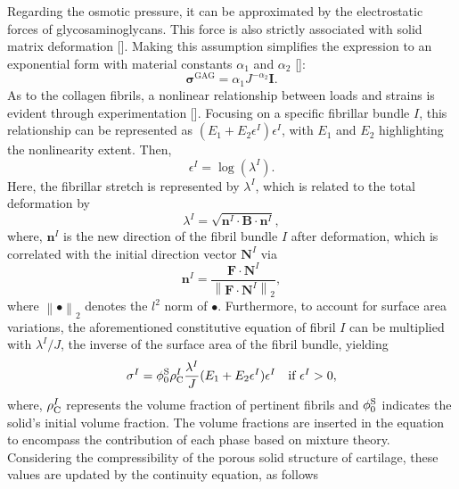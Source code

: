\documentclass[12pt,a4paper]{report}
\begin{document}
Regarding the osmotic pressure, it can be approximated by the electrostatic forces of glycosaminoglycans. This force is also strictly associated with solid matrix deformation [\cite{ateshian2004}]. Making this assumption simplifies the expression to an exponential form with material constants \(\alpha_1\) and \(\alpha_2\) [\cite{ateshian2004,buschmann1995,stender2013}]:
%
\begin{equation}\label{eq-osmotic}
    \boldsymbol{\sigma}^{\text{GAG}} = \alpha_1 J^{-\alpha_2} \mathbf{I}.
\end{equation}
%
As to the collagen fibrils, a nonlinear relationship between loads and strains is evident through experimentation [\cite{charlebois2004}]. Focusing on a specific fibrillar bundle $I$, this relationship can be represented as $(E_1 + E_2 \epsilon^I) \epsilon^I$, with $E_1$ and $E_2$ highlighting the nonlinearity extent. Then,
%
\begin{equation}
    \epsilon^I = \log (\lambda^I).
\end{equation}
%
Here, the fibrillar stretch is represented by $\lambda^I$, which is related to the total deformation by
%
\begin{equation}\label{eq:phi}
    \lambda^I = \sqrt{\mathbf{n}^I \cdot \mathbf{B} \cdot\mathbf{n}^I},
\end{equation}
where, $\mathbf{n}^I$ is the new direction of the fibril bundle $I$ after deformation, which is correlated with the initial direction vector $\mathbf{N}^I$ via 
%
\begin{equation}\label{eq:n}
\mathbf{n}^I = \frac{\mathbf{F} \cdot \mathbf{N}^I}{\left \| \mathbf{F} \cdot\mathbf{N}^I \right \|_{2}},
\end{equation}
%
where $\left \| \bullet \right \|_{2}$ denotes the $l^2$ norm of $\bullet$.  Furthermore, to account for surface area variations, the aforementioned constitutive equation of fibril $I$ can be multiplied with $\lambda^I/J$, the inverse of the surface area of the fibril bundle, yielding
%
\begin{equation}
    \sigma^I = \phi^{\rm S}_0 \rho_{\rm C}^I \frac{\lambda^I}{J}(E_1 + E_2 \epsilon^I) \epsilon^I \quad \text{if } \epsilon^I > 0,
\end{equation}
%
where, $\rho_{\rm C}^I$ represents the volume fraction of pertinent fibrils and $\phi^{\rm S}_0$ indicates the solid's initial volume fraction. The volume fractions are inserted in the equation to encompass the contribution of each phase based on mixture theory. Considering the compressibility of the porous solid structure of cartilage, these values are updated by the continuity equation, as follows
\end{document}
